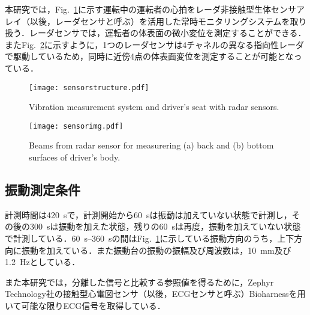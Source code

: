 \documentclass[a4j]{jsarticle}
\begin{document}
本研究では，Fig.~\ref{fig:sensorstructure}に示す運転中の運転者の心拍をレーダ非接触型生体センサアレイ（以後，レーダセンサと呼ぶ）を活用した常時モニタリングシステムを取り扱う．レーダセンサでは，運転者の体表面の微小変位を測定することができる．またFig.~\ref{fig:sensorimg}に示すように，1つのレーダセンサは4チャネルの異なる指向性レーダで駆動しているため，同時に近傍4点の体表面変位を測定することが可能となっている．

\begin{figure}[tb]
  \centering
  \vspace{0pt} %
  \texttt{[image: sensorstructure.pdf]}
  \vspace{0pt} %
  \caption{Vibration measurement system and driver's seat with radar sensors.}
  \vspace{0pt} %
  \label{fig:sensorstructure}
\end{figure}

\begin{figure}[t]
  \centering
  \vspace{0pt} %
  \texttt{[image: sensorimg.pdf]}
  \vspace{0pt} %
  \caption{Beams from radar sensor for measurering (a) back and (b) bottom surfaces of driver's body.}
  \vspace{0pt} %
  \label{fig:sensorimg}
\end{figure}

\subsection{振動測定条件}

計測時間は420~sで，計測開始から60~sは振動は加えていない状態で計測し，その後の300~sは振動を加えた状態，残りの60~sは再度，振動を加えていない状態で計測している．60~s--360~sの間はFig.~\ref{fig:sensorstructure}に示している振動方向のうち，上下方向に振動を加えている．また振動台の振動の振幅及び周波数は，10~mm及び1.2~Hzとしている．

また本研究では，分離した信号と比較する参照値を得るために，Zephyr Technology社の接触型心電図センサ（以後，ECGセンサと呼ぶ）Bioharness\cite{bioharness}を用いて可能な限りECG信号を取得している．
\end{document}
